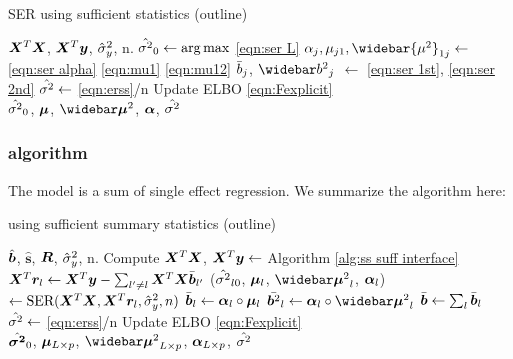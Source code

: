 \begin{algorithm}[H] 
\caption{SER using sufficient statistics (outline)} \label{alg:SERalg}
\begin{algorithmic}[1]
\Require $\bm X^T \bm X$, $\bm X^{T}\bm y$, $\hat{\sigma}_y^2$, n.
\Repeat
\State $\hat{\sigma^2}_0 \gets \arg \max$ \eqref{eqn:ser L}  
\State $\alpha_j, \mu_{j1}, \widebar{\mu^2}_{1j} \gets $ \eqref{eqn:ser alpha} \eqref{eqn:mu1} \eqref{eqn:mu12} 
\State $\bar{b}_j$, $\bbb_j$ $\gets$ \eqref{eqn:ser 1st}, \eqref{eqn:ser 2nd} 
\State $\hat{\sigma^2} \gets$ \eqref{eqn:erss}/n 
\State Update ELBO \eqref{eqn:Fexplicit}
 \\
\Return $\hat{\sigma^2}_0$, $\bm \mu$, $\emusq$, $\bm \alpha$, $\hat{\sigma^2}$
\end{algorithmic}
\end{algorithm}

\subsubsection{\susie algorithm}
The \susie model is a sum of single effect regression. We summarize the algorithm here:
\begin{algorithm}[H] 
\caption{\susie using sufficient summary statistics (outline)} \label{alg:susiealg}
\begin{algorithmic}[1]
\Require $\hat{\bm b}$, $\hat{\bm{s}}$, $\bm R$, $\hat{\sigma}_y^2$, n.
\State Compute $\bm X^T \bm X$, $\bm X^{T}\bm y \gets $ Algorithm \ref{alg:ss suff interface} 
\Repeat
{}
	\State $\bm X^{T}\bm r_l \gets \bm X^{T}\bm y - \sum_{l'\neq l} \bm X^{T}\bm X \bar{\bm b}_{l'}$ 
    \State ($\hat{\sigma^2}_{l0}$, $\bm \mu_l$, $\emusq_l$, $\bm \alpha_l$) $\gets \text{SER}(\bm X^T\bm X, \bm X^T\bm r_l,\hat{\sigma}_y^2, n)$ 
    \State $\bar{\bm b}_l \gets \bm \alpha_l \circ \bm \mu_l$ 
    \State $\bar{\vb^2}_l \gets \valpha_l \circ \emusq_l$ 
\EndFor
\State $\bar{\bm b} \gets \sum_l \bar{\bm b}_l$
\State $\hat{\sigma^2} \gets$ \eqref{eqn:erss}/n
\State Update ELBO \eqref{eqn:Fexplicit}
 \\
\Return $\hat{\bm {\sigma^2}}_0$, $\bm \mu_{L\times p}$, $\emusq_{L\times p}$, $\bm \alpha_{L\times p}$, $\hat{\sigma^2}$
\end{algorithmic}
\end{algorithm}

